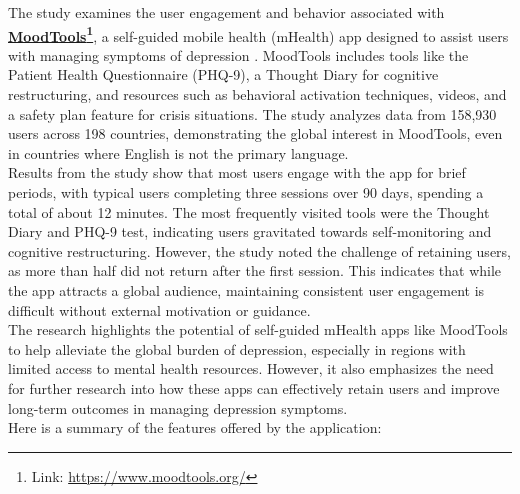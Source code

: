 The study examines the user engagement and behavior associated with \textbf{\href{https://www.moodtools.org/}{MoodTools}\footnote{Link: \url{https://www.moodtools.org/}}}, a self-guided mobile health (mHealth) app designed to assist users with managing symptoms of depression \cite{moodtools-review}. MoodTools includes tools like the Patient Health Questionnaire (PHQ-9), a Thought Diary for cognitive restructuring, and resources such as behavioral activation techniques, videos, and a safety plan feature for crisis situations. The study analyzes data from 158,930 users across 198 countries, demonstrating the global interest in MoodTools, even in countries where English is not the primary language.\vspace{5mm} \\
Results from the study show that most users engage with the app for brief periods, with typical users completing three sessions over 90 days, spending a total of about 12 minutes. The most frequently visited tools were the Thought Diary and PHQ-9 test, indicating users gravitated towards self-monitoring and cognitive restructuring. However, the study noted the challenge of retaining users, as more than half did not return after the first session. This indicates that while the app attracts a global audience, maintaining consistent user engagement is difficult without external motivation or guidance.\vspace{5mm} \\
The research highlights the potential of self-guided mHealth apps like MoodTools to help alleviate the global burden of depression, especially in regions with limited access to mental health resources. However, it also emphasizes the need for further research into how these apps can effectively retain users and improve long-term outcomes in managing depression symptoms.\vspace{5mm} \\
Here is a summary of the features offered by the application:\vspace{5mm}


